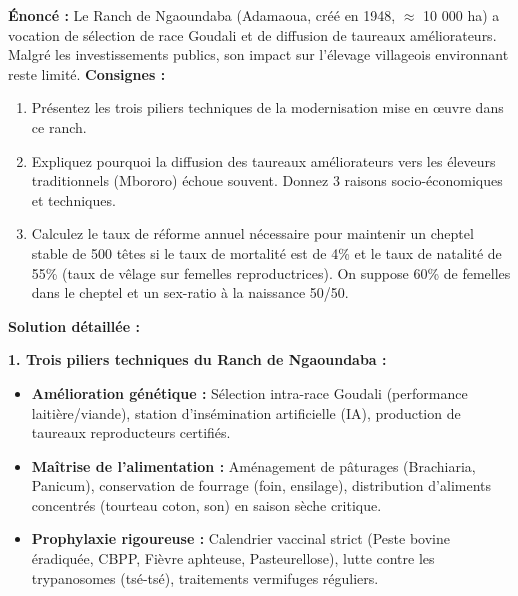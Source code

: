 \documentclass[11pt]{article}
\begin{document}
\begin{exoresolu}
\textbf{Énoncé :} Le Ranch de Ngaoundaba (Adamaoua, créé en 1948, $\approx$ 10 000 ha) a vocation de sélection de race Goudali et de diffusion de taureaux améliorateurs. Malgré les investissements publics, son impact sur l'élevage villageois environnant reste limité.
\textbf{Consignes :}
\begin{enumerate}
    \item Présentez les trois piliers techniques de la modernisation mise en œuvre dans ce ranch.
    \item Expliquez pourquoi la diffusion des taureaux améliorateurs vers les éleveurs traditionnels (Mbororo) échoue souvent. Donnez 3 raisons socio-économiques et techniques.
    \item Calculez le taux de réforme annuel nécessaire pour maintenir un cheptel stable de 500 têtes si le taux de mortalité est de 4\% et le taux de natalité de 55\% (taux de vêlage sur femelles reproductrices). On suppose 60\% de femelles dans le cheptel et un sex-ratio à la naissance 50/50.
\end{enumerate}
\tcblower
\textbf{Solution détaillée :}

\textbf{1. Trois piliers techniques du Ranch de Ngaoundaba :}
\begin{itemize}
    \item \textbf{Amélioration génétique :} Sélection intra-race Goudali (performance laitière/viande), station d'insémination artificielle (IA), production de taureaux reproducteurs certifiés.
    \item \textbf{Maîtrise de l'alimentation :} Aménagement de pâturages (Brachiaria, Panicum), conservation de fourrage (foin, ensilage), distribution d'aliments concentrés (tourteau coton, son) en saison sèche critique.
    \item \textbf{Prophylaxie rigoureuse :} Calendrier vaccinal strict (Peste bovine éradiquée, CBPP, Fièvre aphteuse, Pasteurellose), lutte contre les trypanosomes (tsé-tsé), traitements vermifuges réguliers.
\end{itemize}


\end{exoresolu}
\end{document}
